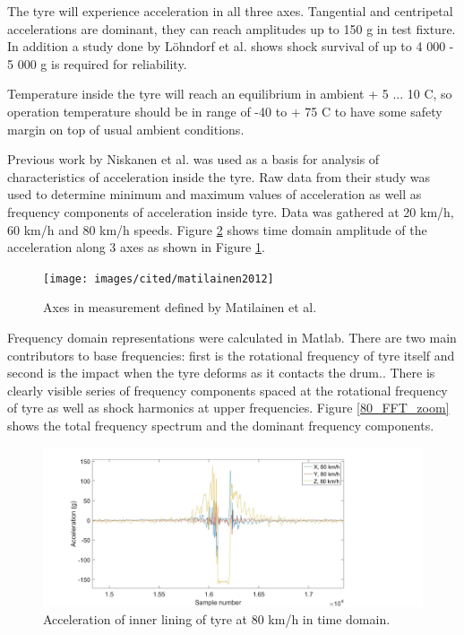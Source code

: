 The tyre will experience acceleration in all three axes\cite{Niskanen2014}. Tangential and centripetal accelerations are dominant, they can reach amplitudes up to 150 g in test fixture. In addition a study done by Löhndorf et al. \cite{Lohndorf2007} shows shock survival of up to 4 000 - 5 000 g is required for reliability. 

Temperature inside the tyre will reach an equilibrium in ambient + 5 ... 10 \degree C, so operation temperature should be in range of -40 to + 75 \degree C to have some safety margin on top of usual ambient conditions. 

Previous work by Niskanen et al. \cite{Niskanen2014} was used as a basis for analysis of characteristics of acceleration inside the tyre. Raw data from their study was used to determine minimum and maximum values of acceleration as well as frequency components of acceleration inside tyre. Data was gathered at 20 km/h, 60 km/h and 80 km/h speeds. Figure \ref{80_TD} shows time domain amplitude of the acceleration along 3 axes as shown in Figure \ref{tyre_axes}.

\begin{figure}[htb]
\begin{center}
\texttt{[image: images/cited/matilainen2012]}
\end{center}
\caption{Axes in measurement defined by Matilainen et al. \cite{Matilainen2012}}
\label{tyre_axes}
\end{figure}

Frequency domain representations were calculated in Matlab. There are two main contributors to base frequencies: first is the rotational frequency of tyre itself and second is the impact when the tyre deforms as it contacts the drum.. There is clearly visible series of frequency components spaced at the rotational frequency of tyre as well as shock harmonics at upper frequencies. Figure \ref{80_FFT_zoom} shows the total frequency spectrum and the dominant frequency components.

\begin{figure}[htb]
\begin{center}
\includegraphics[width=\columnwidth]{images/matlab_figures/80kmh_timedomain_combined}
\end{center}
\caption{Acceleration of inner lining of tyre at 80 km/h in time domain.}
\label{80_TD}
\end{figure}

